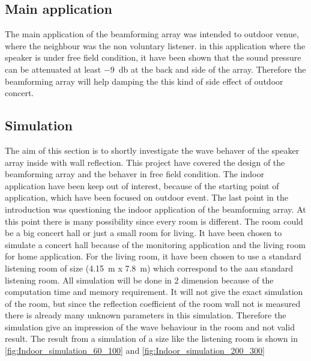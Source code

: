 \subsection{Main application}
The main application of the beamforming array was intended to outdoor venue, where the neighbour was the non voluntary listener. in this application where the speaker is under free field condition, it have been shown that the sound pressure can be attenuated at least \SI{-9}{\decibel} at the back and side of the array. Therefore the beamforming array will help damping the this kind of side effect of outdoor concert.


\subsection{Simulation}\label{sec:dis:simulation}
The aim of this section is to shortly investigate the wave behaver of the speaker array inside with wall reflection. This project have covered the design of the beamforming array and the behaver in free field condition. The indoor application have been keep out of interest, because of the starting point of application, which have been focused on outdoor event. The last point in the introduction was questioning the indoor application of the beamforming array. At this point there is many possibility since every room is different. The room could be a big concert hall or just a small room for living. It have been chosen to simulate a concert hall because of the monitoring application and the living room for home application. For the living room, it have been chosen to use a standard listening room of size (\SI{4.15}{\meter} x \SI{7.8}{\meter}) which correspond to the \gls{aau} standard listening room. All simulation will be done in 2 dimension because of the computation time and memory requirement. It will not give the exact simulation of the room, but since the reflection coefficient of the room wall not is measured there is already many unknown parameters in this simulation. Therefore the simulation give an impression of the wave behaviour in the room and not valid result. The result from a simulation of a size like the listening room is shown in \autoref{fig:Indoor_simulation_60_100} and \autoref{fig:Indoor_simulation_200_300}




